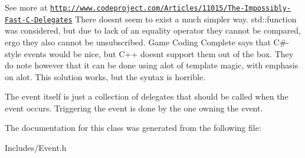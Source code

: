 See more at \href{http://www.codeproject.com/Articles/11015/The-Impossibly-Fast-C-Delegates}{\tt http\+://www.\+codeproject.\+com/\+Articles/11015/\+The-\/\+Impossibly-\/\+Fast-\/\+C-\/\+Delegates} There doesn\textquotesingle{}t seem to exist a much simpler way. std\+::function was considered, but due to lack of an equality operator they cannot be compared, ergo they also cannot be unsubscribed. Game Coding Complete says that C\#-\/style events would be nice, but C++ doesn\textquotesingle{}t support them out of the box. They do note however that it can be done using alot of template magic, with emphasis on alot. This solution works, but the syntax is horrible.

The event itself is just a collection of delegates that should be called when the event occurs. Triggering the event is done by the one owning the event. 

The documentation for this class was generated from the following file\+:\begin{DoxyCompactItemize}
\item 
Includes/Event.\+h\end{DoxyCompactItemize}
